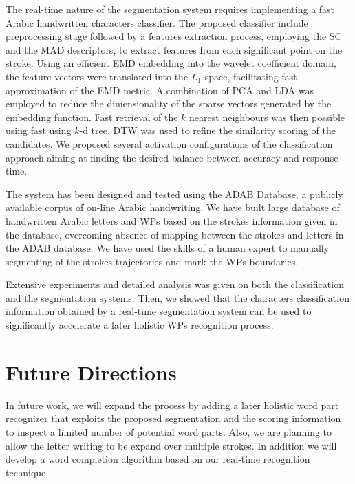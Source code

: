 The real-time nature of the segmentation system requires implementing a fast Arabic handwritten characters classifier.
The proposed classifier include preprocessing stage followed by a features extraction process, employing the SC and the MAD descriptors, to extract features from each significant point on the stroke.
Using an efficient EMD embedding into the wavelet coefficient domain, the feature vectors were translated into the $L_1$ space, facilitating fast approximation of the EMD metric.
A combination of PCA and LDA was employed to reduce the dimensionality of the sparse vectors generated by the embedding function.
Fast retrieval of the $k$ nearest neighbours was then possible using fast using $k$-d tree.
DTW was used to refine the similarity scoring of the candidates.
We proposed several activation configurations of the classification approach aiming at finding the desired balance between accuracy and response time.

The system has been designed and tested using the ADAB Database, a publicly available corpus of on-line Arabic handwriting.
We have built large database of handwritten Arabic letters and WPs based on the strokes information given in the database, overcoming absence of mapping between the strokes and letters in the ADAB database.
We have used the skills of a human expert to manually segmenting of the strokes trajectories and mark the WPs boundaries.

Extensive experiments and detailed analysis was given on both the classification and the segmentation systems.
Then, we showed that the characters classification information obtained by a real-time segmentation system can be used to significantly accelerate a later holistic WPs recognition process.


\newpage{}

\section{Future Directions}
\label{sec:future_directions}

In future work, we will expand the process by adding a later holistic word part recognizer that exploits the proposed segmentation and the scoring information to inspect a limited number of potential word parts.
Also, we are planning to allow the letter writing to be expand over multiple strokes.
In addition we will develop a word completion algorithm based on our real-time recognition technique.

